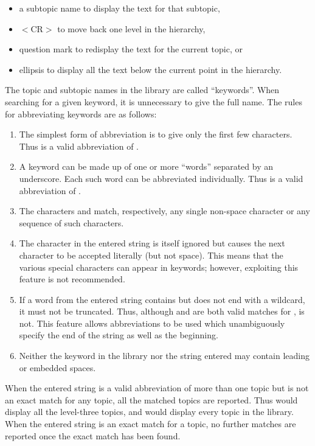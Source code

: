 \begin{itemize}
\item a subtopic name to display the text for that subtopic,
\item $<$CR$>$ to move back one level in the hierarchy,
\item question mark  to
redisplay the text for the current topic, or
\item ellipsis  to display all
the text below the current point in the hierarchy.
\end{itemize}
The topic and subtopic names in the library are called
``keywords''.  When searching for a given keyword, it is unnecessary to
give the full name.  The rules for abbreviating keywords are as follows:
\begin{enumerate}
\item The simplest form of abbreviation is to give only the first few
characters.  Thus  is a valid
abbreviation of .
\item A keyword can be made up of one or more ``words'' separated by an
underscore.  Each such word can be abbreviated individually.  Thus
 is a valid abbreviation of .
\item The characters \fstring{\%} and \fstring{*}
match, respectively, any single
non-space character or any sequence of such characters.
\item The character \fstring{$\backslash$}
in the entered string is itself ignored but
causes the next character to be accepted literally (but not space).
This means that the various special characters can appear in keywords;
however, exploiting this feature is not recommended.
\item If a word from the entered string contains but does not end with a
\fstring{*} wildcard, it must not be truncated.
Thus, although  and  are both valid
matches for ,  is not.
This feature allows abbreviations
to be used which unambiguously specify the end of the string as well as
the beginning.
\item Neither the keyword in the library nor the string entered may
contain leading or embedded spaces.
\end{enumerate}
When the entered string is a valid abbreviation of
more than one topic but is not an
exact match for any topic, all the matched
topics are reported.  Thus \fstring{*  *  *} would display all the level-three
topics, and  would display every topic in the library.
When the entered string is an exact match for a topic, no further
matches are reported once the exact match has been found.

